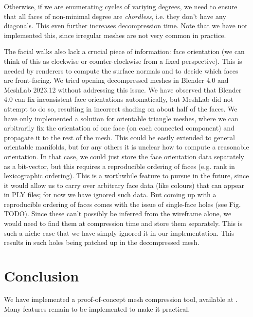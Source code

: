 \documentclass{egpubl}
\begin{document}
Otherwise, if we are enumerating cycles of variying degrees, we need to ensure that all faces of non-minimal degree are \textit{chordless}, i.e. they don't have any diagonals. This even further increases decompression time. %
Note that we have not implemented this, since irregular meshes are not very common in practice.

The facial walks also lack a crucial piece of information: face orientation (we can think of this as clockwise or counter-clockwise from a fixed perspective). This is needed by renderers to compute the surface normals and to decide which faces are front-facing.
We tried opening decompressed meshes in Blender 4.0 and MeshLab 2023.12 without addressing this issue.
We have observed that Blender 4.0 can fix inconsistent face orientations automatically, but MeshLab did not attempt to do so, resulting in incorrect shading on about half of the faces.
We have only implemented a solution for orientable triangle meshes, where we can arbitrarily fix the orientation of one face (on each connected component) and propagate it to the rest of the mesh. This could be easily extended to general orientable manifolds, but for any others it is unclear how to compute a reasonable orientation. In that case, we could just store the face orientation data separately as a bit-vector, but this requires a reproducible ordering of faces (e.g. rank in lexicographic ordering).
This is a worthwhile feature to pursue in the future, since it would allow us to carry over arbitrary face data (like colours) that can appear in PLY files; for now we have ignored such data. 
But coming up with a reproducible ordering of faces comes with the issue of single-face holes (see Fig. TODO).
Since these can't possibly be inferred from the wireframe alone, we would need to find them at compression time and store them separately.
This is such a niche case that we have simply ignored it in our implementation. This results in such holes being patched up in the decompressed mesh.


\section{Conclusion}

We have implemented a proof-of-concept mesh compression tool, available at .
Many features remain to be implemented to make it practical.
\end{document}

